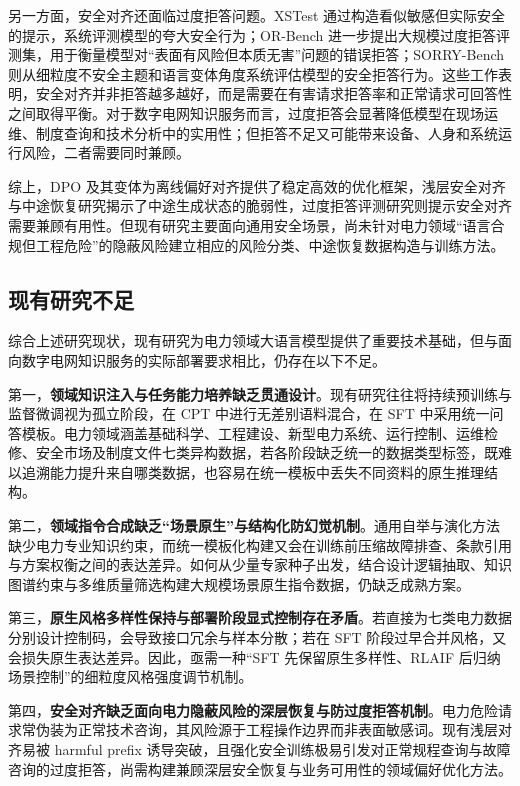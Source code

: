 \documentclass[fontset=fandol,type=master,campus=shenzhen,etitleauto=true]{hithesisbook}
\begin{document}
另一方面，安全对齐还面临过度拒答问题。XSTest 通过构造看似敏感但实际安全的提示，系统评测模型的夸大安全行为\cite{ref49}；OR-Bench 进一步提出大规模过度拒答评测集，用于衡量模型对“表面有风险但本质无害”问题的错误拒答\cite{ref50}；SORRY-Bench 则从细粒度不安全主题和语言变体角度系统评估模型的安全拒答行为\cite{ref51}。这些工作表明，安全对齐并非拒答越多越好，而是需要在有害请求拒答率和正常请求可回答性之间取得平衡。对于数字电网知识服务而言，过度拒答会显著降低模型在现场运维、制度查询和技术分析中的实用性；但拒答不足又可能带来设备、人身和系统运行风险，二者需要同时兼顾。

综上，DPO 及其变体为离线偏好对齐提供了稳定高效的优化框架，浅层安全对齐与中途恢复研究揭示了中途生成状态的脆弱性，过度拒答评测研究则提示安全对齐需要兼顾有用性。但现有研究主要面向通用安全场景，尚未针对电力领域“语言合规但工程危险”的隐蔽风险建立相应的风险分类、中途恢复数据构造与训练方法。

\subsection{现有研究不足}\label{subsec:research-gaps}

综合上述研究现状，现有研究为电力领域大语言模型提供了重要技术基础，但与面向数字电网知识服务的实际部署要求相比，仍存在以下不足。

第一，\textbf{领域知识注入与任务能力培养缺乏贯通设计}。现有研究往往将持续预训练与监督微调视为孤立阶段，在 CPT 中进行无差别语料混合，在 SFT 中采用统一问答模板。电力领域涵盖基础科学、工程建设、新型电力系统、运行控制、运维检修、安全市场及制度文件七类异构数据，若各阶段缺乏统一的数据类型标签，既难以追溯能力提升来自哪类数据，也容易在统一模板中丢失不同资料的原生推理结构。

第二，\textbf{领域指令合成缺乏“场景原生”与结构化防幻觉机制}。通用自举与演化方法缺少电力专业知识约束，而统一模板化构建又会在训练前压缩故障排查、条款引用与方案权衡之间的表达差异。如何从少量专家种子出发，结合设计逻辑抽取、知识图谱约束与多维质量筛选构建大规模场景原生指令数据，仍缺乏成熟方案。

第三，\textbf{原生风格多样性保持与部署阶段显式控制存在矛盾}。若直接为七类电力数据分别设计控制码，会导致接口冗余与样本分散；若在 SFT 阶段过早合并风格，又会损失原生表达差异。因此，亟需一种“SFT 先保留原生多样性、RLAIF 后归纳场景控制”的细粒度风格强度调节机制。

第四，\textbf{安全对齐缺乏面向电力隐蔽风险的深层恢复与防过度拒答机制}。电力危险请求常伪装为正常技术咨询，其风险源于工程操作边界而非表面敏感词。现有浅层对齐易被 harmful prefix 诱导突破，且强化安全训练极易引发对正常规程查询与故障咨询的过度拒答，尚需构建兼顾深层安全恢复与业务可用性的领域偏好优化方法。
\end{document}
